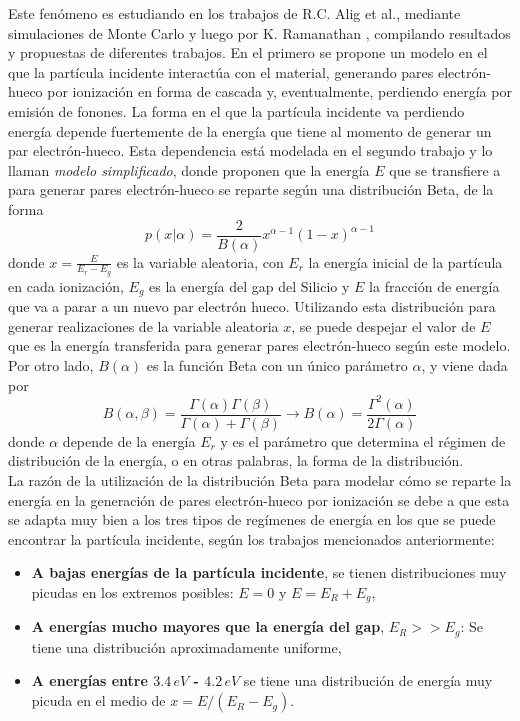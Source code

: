 \indent Este fenómeno es estudiando en los trabajos de R.C. Alig et al.\cite{Alig}, mediante simulaciones de Monte Carlo y luego por K. Ramanathan \cite{Ramanathan}, compilando resultados y propuestas de diferentes trabajos. En el primero se propone un modelo en el que la partícula incidente interactúa con el material, generando pares electrón-hueco por ionización en forma de cascada y, eventualmente, perdiendo energía por emisión de fonones. La forma en el que la partícula incidente va perdiendo energía depende fuertemente de la energía que tiene al momento de generar un par electrón-hueco. Esta dependencia está modelada en el segundo trabajo y lo llaman \textit{modelo simplificado}, donde proponen que la energía $E$ que se transfiere a para generar pares electrón-hueco se reparte según una distribución Beta, de la forma
\begin{equation*}
    p(x|\alpha) = \frac{2}{B(\alpha)} x^{\alpha - 1}(1-x)^{\alpha - 1}
\end{equation*}
donde $x = \frac{E}{E_{r} - E_{g}}$ es la variable aleatoria, con $E_{r}$ la energía inicial de la partícula en cada ionización, $E_{g}$ es la energía del gap del Silicio y $E$ la fracción de energía que va a parar a un nuevo par electrón hueco. Utilizando esta distribución para generar realizaciones de la variable aleatoria $x$, se puede despejar el valor de $E$ que es la energía transferida para generar pares electrón-hueco según este modelo. Por otro lado, $B(\alpha)$ es la función Beta con un único parámetro $\alpha$, y viene dada por
\begin{equation*}
    B(\alpha, \beta) 
    = \frac{\Gamma(\alpha)\Gamma(\beta)}{\Gamma(\alpha) + \Gamma(\beta)}
    \longrightarrow
    B(\alpha)
    = \frac{\Gamma^{2}(\alpha)}{2\Gamma(\alpha)}
\end{equation*}
donde $\alpha$ depende de la energía $E_{r}$ y es el parámetro que determina el régimen de distribución de la energía, o en otras palabras, la forma de la distribución.\\
\indent La razón de la utilización de la distribución Beta para modelar cómo se reparte la energía en la generación de pares electrón-hueco por ionización se debe a que esta se adapta muy bien a los tres tipos de regímenes de energía en los que se puede encontrar la partícula incidente, según los trabajos mencionados anteriormente:
\begin{itemize}
    \item \textbf{A bajas energías de la partícula incidente}, se tienen distribuciones muy picudas en los extremos posibles: $E = 0$ y $E = E_{R}+E_{g}$,
    \item \textbf{A energías mucho mayores que la energía del gap}, $E_{R} >> E_{g}$: Se tiene una distribución aproximadamente uniforme,
    \item \textbf{A energías entre $3.4\,\si{eV}$ - $4.2\,\si{eV}$} se tiene una distribución de energía muy picuda en el medio de $x = E/(E_{R} - E_{g})$.
\end{itemize}
